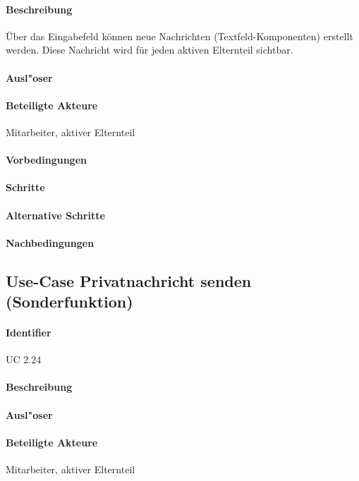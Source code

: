   \paragraph{Beschreibung}
  Über das Eingabefeld können neue Nachrichten (Textfeld-Komponenten) erstellt werden. Diese Nachricht wird für jeden aktiven Elternteil sichtbar.
  \paragraph{Ausl"oser}
  \paragraph{Beteiligte Akteure}   \leavevmode \newline
    Mitarbeiter, aktiver Elternteil
  \paragraph{Vorbedingungen}
  \paragraph{Schritte}
  \paragraph{Alternative Schritte}
  \paragraph{Nachbedingungen}
  
  \newpage
 \subsection{Use-Case Privatnachricht senden (Sonderfunktion)}
  \paragraph{Identifier}
  UC 2.24
  \paragraph{Beschreibung}
  \paragraph{Ausl"oser}
  \paragraph{Beteiligte Akteure}   \leavevmode \newline
    Mitarbeiter, aktiver Elternteil

